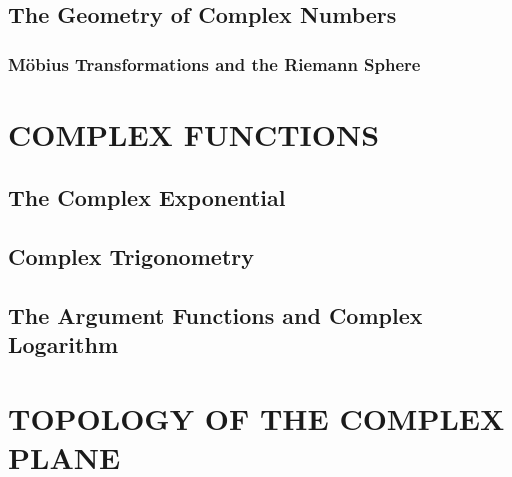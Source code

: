 \documentclass{refbook}
\begin{document}
\subsection{The Geometry of Complex Numbers}
\subsubsection{Möbius Transformations and the Riemann Sphere}


\section{COMPLEX FUNCTIONS}
\subsection{The Complex Exponential}
\subsection{Complex Trigonometry}
\subsection{The Argument Functions and Complex Logarithm}


\section{TOPOLOGY OF THE COMPLEX PLANE}
\end{document}
